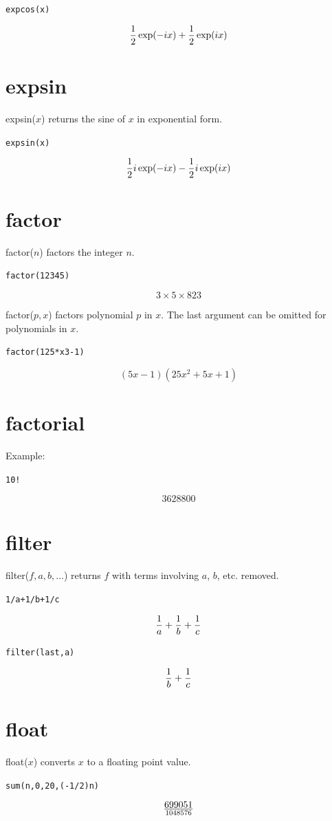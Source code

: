 \documentclass[12pt,openany]{report}
\begin{document}
\medskip
{\tt expcos(x)}

$${1\over2}\exp(-ix)+{1\over2}\exp(ix)$$

\section*{expsin}
expsin($x$) returns the sine of $x$ in exponential form.

\medskip
{\tt expsin(x)}

$${1\over2}i\exp(-ix)-{1\over2}i\exp(ix)$$

\section*{factor}
factor($n$) factors the integer $n$.

\medskip
{\tt factor(12345)}

$$3\times 5\times 823$$

\medskip
\noindent
factor($p,x$) factors polynomial $p$ in $x$.
The last argument can be omitted for polynomials in $x$.

\medskip
{\tt factor(125*x{}3-1)}

$$(5x-1)(25x^2+5x+1)$$

\section*{factorial}
Example:

\medskip
{\tt 10!}

$$3628800$$

\section*{filter}
filter($f,a,b,\ldots$) returns $f$ with terms involving $a$, $b$, etc. removed.

\medskip
{\tt 1/a+1/b+1/c}

$${1\over a}+{1\over b}+{1\over c}$$

{\tt filter(last,a)}

$${1\over b}+{1\over c}$$

\section*{float}
float($x$) converts $x$ to a floating point value.

\medskip
{\tt sum(n,0,20,(-1/2){}n)}

$$699051\over1048576$$
\end{document}
